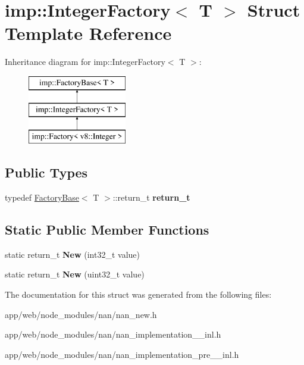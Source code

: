 \hypertarget{structimp_1_1_integer_factory}{}\section{imp\+:\+:Integer\+Factory$<$ T $>$ Struct Template Reference}
\label{structimp_1_1_integer_factory}
Inheritance diagram for imp\+:\+:Integer\+Factory$<$ T $>$\+:\begin{figure}[H]
\begin{center}
\leavevmode
\includegraphics[height=3.000000cm]{structimp_1_1_integer_factory}
\end{center}
\end{figure}
\subsection*{Public Types}
\begin{DoxyCompactItemize}
\item 
\mbox{\label{structimp_1_1_integer_factory_a1b0fcfb261bc4250bb23473cdbc4dd2c}} 
typedef \hyperlink{structimp_1_1_factory_base}{Factory\+Base}$<$ T $>$\+::return\+\_\+t {\bfseries return\+\_\+t}
\end{DoxyCompactItemize}
\subsection*{Static Public Member Functions}
\begin{DoxyCompactItemize}
\item 
\mbox{\label{structimp_1_1_integer_factory_aeaff9a26dbaf2292833696bcae2ec505}} 
static return\+\_\+t {\bfseries New} (int32\+\_\+t value)
\item 
\mbox{\label{structimp_1_1_integer_factory_a8e4759a2142c931e44b4c13668325c2d}} 
static return\+\_\+t {\bfseries New} (uint32\+\_\+t value)
\end{DoxyCompactItemize}


The documentation for this struct was generated from the following files\+:\begin{DoxyCompactItemize}
\item 
app/web/node\+\_\+modules/nan/nan\+\_\+new.\+h\item 
app/web/node\+\_\+modules/nan/nan\+\_\+implementation\+\_\+\_\+inl.\+h\item 
app/web/node\+\_\+modules/nan/nan\+\_\+implementation\+\_\+pre\+\_\+\_\+inl.\+h\end{DoxyCompactItemize}

